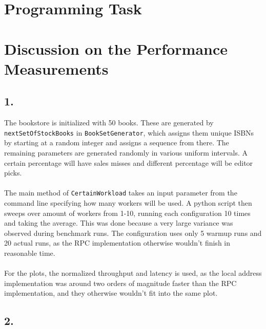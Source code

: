 \documentclass[12pt]{article}
\begin{document}
\section*{Programming Task}
\section*{Discussion on the Performance Measurements}
\subsection*{1.}

The bookstore is initialized with 50 books. These are generated by \verb|nextSetOfStockBooks| in \verb|BookSetGenerator|, which assigns them unique ISBNs by starting at a random integer and assigns a sequence from there. The remaining parameters are generated randomly in various uniform intervals. A certain percentage will have sales misses and different percentage will be editor picks.
\\
\\
The main method of \verb|CertainWorkload| takes an input parameter from the command line specifying how many workers will be used. A python script then sweeps over amount of workers from 1-10, running each configuration 10 times and taking the average. This was done because a very large variance was observed during benchmark runs. The configuration uses only 5 warmup runs and 20 actual runs, as the RPC implementation otherwise wouldn't finish in reasonable time.
\\
\\
For the plots, the normalized throughput and latency is used, as the local address implementation was around two orders of magnitude faster than the RPC implementation, and they otherwise wouldn't fit into the same plot.

\subsection*{2.}
\end{document}
